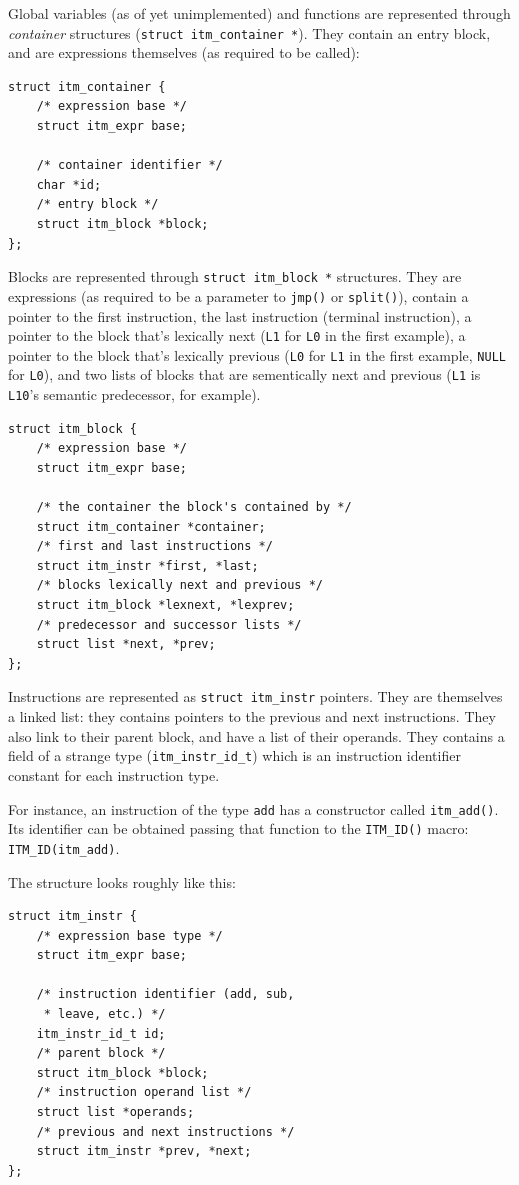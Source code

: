 \documentclass[12pt, a4paper]{article}
\begin{document}
Global variables (as of yet unimplemented) and functions are represented through
\textit{container} structures (\verb+struct itm_container *+). They contain an
entry block, and are expressions themselves (as required to be called):

\begin{lstlisting}
struct itm_container {
	/* expression base */
	struct itm_expr base;

	/* container identifier */
	char *id;
	/* entry block */
	struct itm_block *block;
};
\end{lstlisting}

Blocks are represented through \verb+struct itm_block *+ structures. They are
expressions (as required to be a parameter to \verb+jmp()+ or \verb+split()+),
contain a pointer to the first instruction, the last instruction (terminal
instruction), a pointer to the block that's lexically next (\verb+L1+ for
\verb+L0+ in the first example), a pointer to the block that's lexically previous
(\verb+L0+ for \verb+L1+ in the first example, \verb+NULL+ for \verb+L0+),
and two lists of blocks that are sementically next and previous (\verb+L1+ is
\verb+L10+'s semantic predecessor, for example).

\begin{lstlisting}
struct itm_block {
	/* expression base */
	struct itm_expr base;

	/* the container the block's contained by */
	struct itm_container *container;
	/* first and last instructions */
	struct itm_instr *first, *last;
	/* blocks lexically next and previous */
	struct itm_block *lexnext, *lexprev;
	/* predecessor and successor lists */
	struct list *next, *prev;
};
\end{lstlisting}

Instructions are represented as \verb+struct itm_instr+ pointers. They are
themselves a linked list: they contains pointers to the previous and next
instructions. They also link to their parent block, and have a list of their
operands. They contains a field of a strange type (\verb+itm_instr_id_t+) which
is an instruction identifier constant for each instruction type.

For instance, an instruction of the type \verb+add+ has a constructor called
\verb+itm_add()+. Its identifier can be obtained passing that function to the
\verb+ITM_ID()+ macro: \verb+ITM_ID(itm_add)+.

The structure looks roughly like this:

\begin{lstlisting}
struct itm_instr {
	/* expression base type */
	struct itm_expr base;

	/* instruction identifier (add, sub,
	 * leave, etc.) */
	itm_instr_id_t id;
	/* parent block */
	struct itm_block *block;
	/* instruction operand list */
	struct list *operands;
	/* previous and next instructions */
	struct itm_instr *prev, *next;
};
\end{lstlisting}
\end{document}
